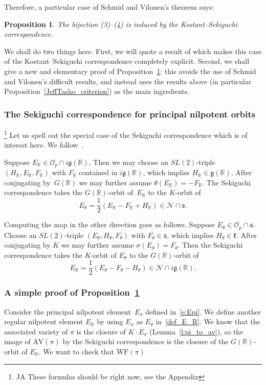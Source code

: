 \documentclass[10pt,leqno]{article}
\newtheorem{proposition}[equation]{Proposition}
\renewcommand{\O}{\mathcal O}
\newcommand{\R}{\mathbb R}
\newcommand{\N}{\mathcal N}
\renewcommand{\k}{\mathfrak k}
\newcommand{\g}{\mathfrak g}
\newcommand{\s}{\mathfrak s}
\newcommand{\AV}{\mathrm{AV}}
\newcommand{\WF}{\mathrm{WF}}
\newcommand{\Op}{\O_p}
\begin{document}
Therefore, a particular case of Schmid and Vilonen's theorem says: 
\begin{proposition} \label{Sekiguchi_result} The bijection (3)--(4) is induced by the Kostant--Sekiguchi correspondence.
\end{proposition} 
We shall do two things here. First, we will quote a result of \cite{AVAV} which makes this case of the Kostant--Sekiguchi correspondence completely explicit. Second, we shall give a new and elementary proof of Proposition~\ref{Sekiguchi_result}: this avoids the use of Schmid and Vilonen's difficult results, and instead uses the results above (in particular Proposition~\ref{JeffTasho_criterion}) as the main ingredients. 


\subsubsection{The Sekiguchi correspondence for principal nilpotent orbits}\label{sec:concrete_sek}
\footnote{JA These formulas should be right now, see the Appendix}
Let us spell out the special case of the Sekiguchi correspondence which is of interest here. We follow~\cite[Section~2]{AVAV}.

Suppose $E_\R\in \Op\cap i\g(\R)$. Then we may choose an $SL(2)$-triple $(H_\R,E_\R,F_\R)$ with $F_\R$  contained in $i\g(\R)$,
which implies $H_\R\in \g(\R)$. 
After conjugating by~$G(\R)$ we may further assume $\theta(E_\R)=-F_\R$.
The Sekiguchi correspondence takes the $G(\R)$-orbit of~$E_\R$ to the $K$-orbit of
$$
E_\theta=\frac12(E_\R-F_\R+H_\R)\in \N\cap \s.
$$

Computing the map in the other direction goes as follows.
Suppose $E_\theta\in \Op\cap\s$. Choose an $SL(2)$-triple  $(E_\theta, H_\theta,F_\theta)$ with
$F_\theta\in\s$, which implies $H_\theta\in\k$. After conjugating by $K$ we may further assume $\sigma(E_\theta)=F_\theta$.
Then the Sekiguchi correspondence takes the $K$-orbit of $E_\theta$ to the $G(\R)$-orbit of 
\begin{equation}\label{def_E_R}
E_\R=\frac 12(E_\theta-F_\theta-H_\theta)\in\N\cap i\g(\R).
\end{equation}

\subsubsection{A simple proof of Proposition~\ref{Sekiguchi_result}}\label{sec:sekiguchi_proof}

Consider the principal nilpotent element~$E_\pi$ defined in~\eqref{e:Epi}. We define another regular nilpotent element  $E_\R$ by using $E_\pi$ as $E_\theta$ in~\eqref{def_E_R}. We know that the associated variety of $\pi$ is the closure of $K \cdot E_\pi$ (Lemma~\ref{l:pi_to_av}), so the image of $\AV(\pi)$ by the Sekiguchi correspondence is the closure of the $G(\R)$-orbit of $E_\R$. We want to check that $\WF(\pi)$ 
\end{document}
